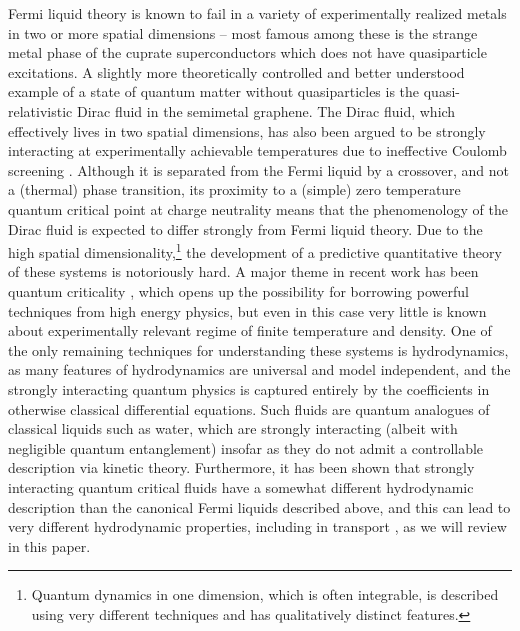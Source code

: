 Fermi liquid theory is known to fail in a variety of experimentally realized metals in two or more spatial dimensions -- most famous among these is the strange metal phase of the cuprate superconductors \cite{marel_quantum_2003, cooper_anomalous_323, keimer_quantum_2011} which does not have quasiparticle excitations.  A slightly more theoretically controlled  and better understood example  of a state of quantum matter without quasiparticles is the quasi-relativistic Dirac fluid in the semimetal graphene.   The Dirac fluid, which effectively lives in two spatial dimensions, has also been argued to be strongly interacting at experimentally achievable temperatures \cite{sheehy_quantum_2007, muller_collective_2008, fritz_quantum_2008, li_scanning_2009} due to ineffective Coulomb screening \cite{siegel_charge-carrier_2013}.    Although it is separated from the Fermi liquid by a crossover, and not a (thermal) phase transition, its proximity to a (simple) zero temperature quantum critical point at charge neutrality means that the phenomenology of the Dirac fluid is expected to differ strongly from Fermi liquid theory.   Due to the high spatial dimensionality,\footnote{Quantum dynamics in one dimension,  which is often integrable, is described using very different techniques and has qualitatively distinct features.} the development of a predictive quantitative theory of these systems is notoriously hard.   A major theme in recent work has been quantum criticality \cite{damle_nonzero-temperature_1997, sachdev_quantum_2011}, which opens up the possibility for borrowing powerful techniques from high energy physics,  but even in this case very little is known about experimentally relevant regime of finite temperature and density.    One of the only remaining techniques for understanding these systems is hydrodynamics, as many features of hydrodynamics are universal and model independent, and the strongly interacting quantum physics is captured entirely by the coefficients in otherwise classical differential equations.  Such fluids are quantum analogues of classical liquids such as water, which are strongly interacting (albeit with negligible quantum entanglement) insofar as they do not admit a controllable description via kinetic theory.   Furthermore, it has been shown \cite{hartnoll_theory_2007} that strongly interacting quantum critical fluids have a somewhat different hydrodynamic description than the canonical Fermi liquids described above, and this can lead to very different hydrodynamic properties,  including in transport \cite{hartnoll_theory_2007, muller_collective_2008, fritz_quantum_2008, muller_quantum-critical_2008, muller_graphene:_2009, foster_slow_2009, davison_holographic_2014}, as we will review in this paper.

